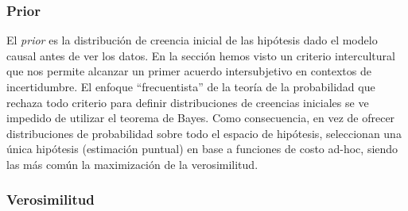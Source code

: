 \documentclass[a4paper,10pt]{book}
\theoremstyle{definition}
\begin{document}
\subsubsection*{Prior}

El \emph{prior} es la distribuci\'on de creencia inicial de las hip\'otesis dado el modelo causal antes de ver los datos.
%
En la secci\'on \emph{} hemos visto un criterio intercultural que nos permite alcanzar un primer acuerdo intersubjetivo en contextos de incertidumbre.
%
El enfoque ``frecuentista'' de la teor\'ia de la probabilidad que rechaza todo criterio para definir distribuciones de creencias iniciales se ve impedido de utilizar el teorema de Bayes.
%
Como consecuencia, en vez de ofrecer distribuciones de probabilidad sobre todo el espacio de hip\'otesis, seleccionan una única hip\'otesis (estimaci\'on puntual) en base a funciones de costo ad-hoc, siendo las m\'as común la maximizaci\'on de la verosimilitud.

\subsubsection*{Verosimilitud}
\end{document}
